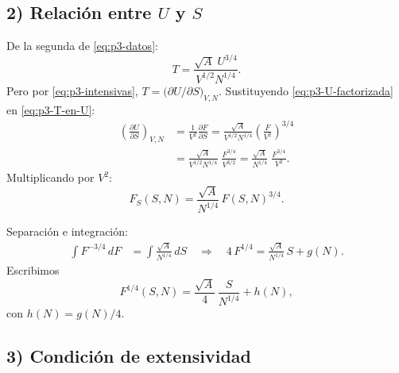 \documentclass{article}
\begin{document}
\subsection*{2) Relación entre \(U\) y \(S\)}

De la segunda de \eqref{eq:p3-datos}:
\begin{equation}
T=\frac{\sqrt{A}\;U^{3/4}}{V^{1/2}N^{1/4}}.
\label{eq:p3-T-en-U}
\end{equation}
Pero por \eqref{eq:p3-intensivas}, \(T=\big(\partial U/\partial S\big)_{V,N}\).  
Sustituyendo \eqref{eq:p3-U-factorizada} en \eqref{eq:p3-T-en-U}:
\begin{equation}
\begin{split}
\left(\frac{\partial U}{\partial S}\right)_{V,N}
&= \frac{1}{V^{2}}\frac{\partial F}{\partial S}
= \frac{\sqrt{A}}{V^{1/2}N^{1/4}}\left(\frac{F}{V^{2}}\right)^{3/4} \\[4pt]
&= \frac{\sqrt{A}}{V^{1/2}N^{1/4}}\;\frac{F^{3/4}}{V^{3/2}}
= \frac{\sqrt{A}}{N^{1/4}}\;\frac{F^{3/4}}{V^{2}}.
\end{split}
\label{eq:p3-edo-S-previa}
\end{equation}
Multiplicando por \(V^{2}\):
\begin{equation}
F_{S}(S,N)=\frac{\sqrt{A}}{N^{1/4}}\,F(S,N)^{3/4}.
\label{eq:p3-edo-S}
\end{equation}

Separación e integración:
\begin{equation}
\begin{split}
\int F^{-3/4}\,dF
&= \int \frac{\sqrt{A}}{N^{1/4}}\,dS
\quad\Longrightarrow\quad
4\,F^{1/4}
= \frac{\sqrt{A}}{N^{1/4}}\,S + g(N).
\end{split}
\label{eq:p3-int-S}
\end{equation}
Escribimos
\begin{equation}
F^{1/4}(S,N) = \frac{\sqrt{A}}{4}\,\frac{S}{N^{1/4}} + h(N),
\label{eq:p3-F14}
\end{equation}
con \(h(N)=g(N)/4\).

\subsection*{3) Condición de extensividad}
\end{document}
